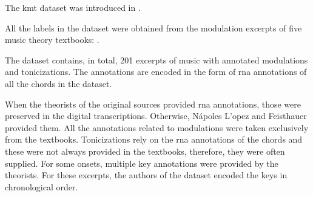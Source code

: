 
The \gls{kmt} dataset was introduced in
\textcite{napoleslopez2020local}.

All the labels in the dataset were obtained from the
modulation excerpts of five music theory textbooks:
\textcite{aldwell2019harmony, kostka2008tonal,
reger1904supplement, rimskikorsakov1886practical,
tchaikovsky1872guide}.

The dataset contains, in total, 201 excerpts of music with
annotated modulations and tonicizations. The annotations are
encoded in the form of \gls{rna} annotations of all the
chords in the dataset. 

When the theorists of the original sources provided
\gls{rna} annotations, those were preserved in the digital
transcriptions. Otherwise, N\'apoles L'opez and Feisthauer
provided them. All the annotations related to modulations
were taken exclusively from the textbooks. Tonicizations
rely on the \gls{rna} annotations of the chords and these
were not always provided in the textbooks, therefore, they
were often supplied. For some onsets, multiple key
annotations were provided by the theorists. For these
excerpts, the authors of the dataset encoded the keys in
chronological order.
